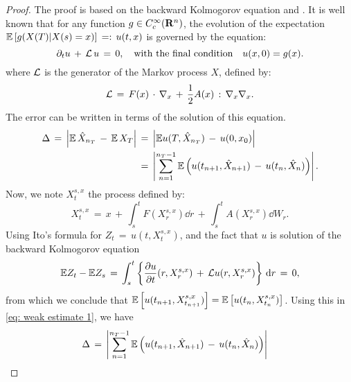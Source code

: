 \begin{proof}
    The proof is based on the backward Kolmogorov equation
    \cite{kloeden1992numerical} and \cite{weinan2005analysis}. It is well known
    that for any function $g \in \test{\real^n}$, the evolution of the
    expectation $\expect \left[g(X(T)| X(s) = x)\right] \,=: \, u(t,x)$ is governed by the equation:
    \begin{equation*}
        \pard{u}{t} \,+\,\op L\,u  \,=\,0,  \quad \text{with the final condition} \quad u(x,0) =
        g(x). 
    \end{equation*}
    where $\op L$ is the generator of the Markov process $X$, defined by:
    \begin{equation*}
            \op L \,=\,F(x) \dotx \grad_x \,+\,\frac{1}{2} A(x)\,:\,\grad_x \grad_x.
    \end{equation*}
    The error can be written in terms of the solution of this equation.
    \begin{equation}
        \begin{aligned}
            \Delta \,=\, \abs{ \expect\, \hat X_{n_T}\,-\,\expect\, X_T } &\,=\, \abs{ \expect u(T,\hat X_{n_T}) \,-\,u(0,x_0) } \\
            &\,=\, \abs{ \sum_{n=1}^{n_T-1}\expect \left( u(t_{n+1}, \hat X_{n+1}) \,-\, u(t_n, \hat X_n) \right)}.
        \end{aligned}
        \label{eq: weak estimate 1}
    \end{equation}
    Now, we note $X_t^{s,x}$ the process defined by:
    \begin{equation*}
        X_t^{s,x} \,=\, x \,+\, \int_s^t F(X_r^{s,x}) \dd r \,+\, \int_s^t A(X_r^{s,x})  \dd W_r.
    \end{equation*}
    Using Ito's formula for $Z_t \,=\, u(t,X_t^{s,x})$, and the fact that $u$
    is solution of the backward Kolmogorov equation
    \begin{equation*}
        \expect Z_t - \expect Z_s \,=\, \int_s^t \left\{\pardl{u}{t}(r, X_r^{s,x}) \,+\, \op Lu(r, X_r^{s,x}) \right\} \dd r \,=\, 0,
    \end{equation*}
    from which we conclude that $\expect \left[u(t_{n+1},
        X_{t_{n+1}}^{s,x})\right] = \expect \left[u(t_n,
        X_{t_n}^{s,x})\right]$. Using this in \cref{eq: weak estimate 1}, we have
    \begin{equation*}
        \begin{aligned}
            \Delta &\,=\, \abs{ \sum_{n=1}^{n_T-1}\expect \left( u(t_{n+1}, \hat
                X_{n+1}) \,-\, u(t_n, \hat X_n) \right)
}
\end{aligned}
\end{equation*}
\end{proof}
